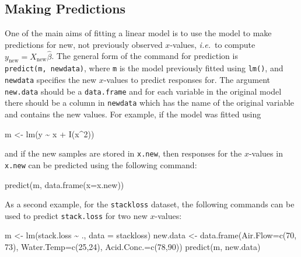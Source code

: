 \documentclass[
  a4paper,
]{article}
\newenvironment{Shaded}{\begin{snugshade}}{\end{snugshade}}
\newcommand{\AttributeTok}[1]{\textcolor[rgb]{0.77,0.63,0.00}{#1}}
\newcommand{\DecValTok}[1]{\textcolor[rgb]{0.00,0.00,0.81}{#1}}
\newcommand{\FunctionTok}[1]{\textcolor[rgb]{0.00,0.00,0.00}{#1}}
\newcommand{\NormalTok}[1]{#1}
\newcommand{\OtherTok}[1]{\textcolor[rgb]{0.56,0.35,0.01}{#1}}
\newcommand{\SpecialCharTok}[1]{\textcolor[rgb]{0.00,0.00,0.00}{#1}}
\theoremstyle{definition}
\theoremstyle{definition}
\theoremstyle{definition}
\theoremstyle{definition}
\theoremstyle{remark}
\begin{document}
\hypertarget{lm-predict}{%
\subsection*{Making Predictions}\label{lm-predict}}

One of the main aims of fitting a linear model is to use the model to make
predictions for new, not previously observed \(x\)-values, \emph{i.e.}~to compute
\(y_{\mathrm{new}} = X_{\mathrm{new}} \hat\beta\). The general form of the
command for prediction is \texttt{predict(m,\ newdata)}, where \texttt{m} is the model
previously fitted using \texttt{lm()}, and \texttt{newdata} specifies the new \(x\)-values to
predict responses for. The argument \texttt{new.data} should be a \texttt{data.frame} and
for each variable in the original model there should be a column in \texttt{newdata}
which has the name of the original variable and contains the new values. For
example, if the model was fitted using

\begin{Shaded}
\begin{Highlighting}[]
\NormalTok{  m }\OtherTok{\textless{}{-}} \FunctionTok{lm}\NormalTok{(y }\SpecialCharTok{\textasciitilde{}}\NormalTok{ x }\SpecialCharTok{+} \FunctionTok{I}\NormalTok{(x}\SpecialCharTok{\^{}}\DecValTok{2}\NormalTok{))}
\end{Highlighting}
\end{Shaded}

and if the new samples are stored in \texttt{x.new}, then responses for
the \(x\)-values in \texttt{x.new} can be predicted using the following
command:

\begin{Shaded}
\begin{Highlighting}[]
  \FunctionTok{predict}\NormalTok{(m, }\FunctionTok{data.frame}\NormalTok{(}\AttributeTok{x=}\NormalTok{x.new))}
\end{Highlighting}
\end{Shaded}

As a second example, for the \texttt{stackloss} dataset, the following
commands can be used to predict \texttt{stack.loss} for two new
\(x\)-values:

\begin{Shaded}
\begin{Highlighting}[]
\NormalTok{  m }\OtherTok{\textless{}{-}} \FunctionTok{lm}\NormalTok{(stack.loss }\SpecialCharTok{\textasciitilde{}}\NormalTok{ ., }\AttributeTok{data =}\NormalTok{ stackloss)}
\NormalTok{  new.data }\OtherTok{\textless{}{-}} \FunctionTok{data.frame}\NormalTok{(}\AttributeTok{Air.Flow=}\FunctionTok{c}\NormalTok{(}\DecValTok{70}\NormalTok{, }\DecValTok{73}\NormalTok{), }\AttributeTok{Water.Temp=}\FunctionTok{c}\NormalTok{(}\DecValTok{25}\NormalTok{,}\DecValTok{24}\NormalTok{), }\AttributeTok{Acid.Conc.=}\FunctionTok{c}\NormalTok{(}\DecValTok{78}\NormalTok{,}\DecValTok{90}\NormalTok{))}
  \FunctionTok{predict}\NormalTok{(m, new.data)}
\end{Highlighting}
\end{Shaded}
\end{document}
